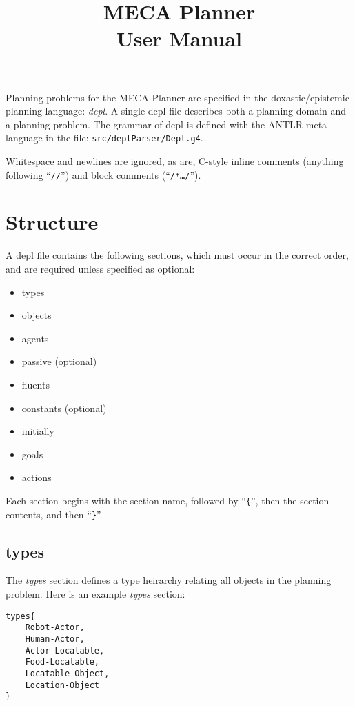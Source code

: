 \documentclass{article}
\title{MECA Planner  \\
\large User Manual
}
\begin{document}
\maketitle


Planning problems for the MECA Planner are specified in the doxastic/epistemic
planning language: \emph{depl}. A single depl file describes both a planning domain
and a planning problem.
The grammar of depl is defined with the ANTLR meta-language in the file:
\texttt{src/deplParser/Depl.g4}.

Whitespace and newlines are ignored,
as are, C-style inline comments (anything
following ``\texttt{//}'') and block comments (``\texttt{/*\ldots*/}'').


\section{Structure}

A depl file contains the following sections, which must occur in the correct
order, and are required unless specified as optional:

\begin{itemize}
\item types
\item objects
\item agents
\item passive (optional)
\item fluents
\item constants (optional)
\item initially
\item goals
\item actions
\end{itemize}

\noindent
Each section begins with the section name, followed by
``\verb|{|'', 
then the section contents, and then
``\verb|}|''. 


\subsection{types}

The \emph{types} section defines a type heirarchy relating all objects in the planning
problem.
Here is an example \emph{types} section:
\begin{verbatim}
types{
    Robot-Actor,
    Human-Actor,
    Actor-Locatable,
    Food-Locatable,
    Locatable-Object,
    Location-Object
}
\end{verbatim}
\end{document}
